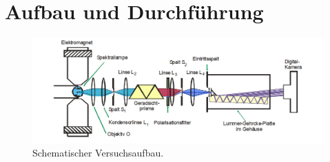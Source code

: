 \section{Aufbau und Durchführung}
\FloatBarrier
\begin{figure}
  \centering
  \includegraphics[scale=0.5]{aufbau.PNG}
  \caption{Schematischer Versuchsaufbau. \cite{Q1}}
  \label{abb4}
\end{figure}
\FloatBarrier

